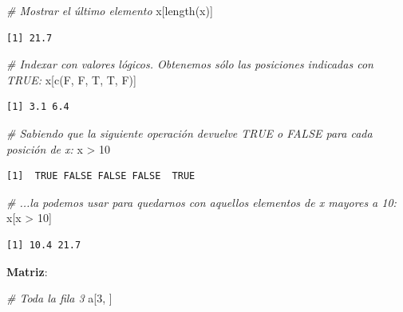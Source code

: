 \documentclass[
]{book}
\newenvironment{Shaded}{\begin{snugshade}}{\end{snugshade}}
\newcommand{\CommentTok}[1]{\textcolor[rgb]{0.56,0.35,0.01}{\textit{#1}}}
\newcommand{\DecValTok}[1]{\textcolor[rgb]{0.00,0.00,0.81}{#1}}
\newcommand{\FunctionTok}[1]{\textcolor[rgb]{0.00,0.00,0.00}{#1}}
\newcommand{\NormalTok}[1]{#1}
\newcommand{\SpecialCharTok}[1]{\textcolor[rgb]{0.00,0.00,0.00}{#1}}
\begin{document}
\begin{Shaded}
\begin{Highlighting}[]
\CommentTok{\# Mostrar el último elemento}
\NormalTok{x[}\FunctionTok{length}\NormalTok{(x)]}
\end{Highlighting}
\end{Shaded}

\begin{verbatim}
[1] 21.7
\end{verbatim}

\begin{Shaded}
\begin{Highlighting}[]
\CommentTok{\# Indexar con valores lógicos. Obtenemos sólo las posiciones indicadas con TRUE:}
\NormalTok{x[}\FunctionTok{c}\NormalTok{(F, F, T, T, F)]}
\end{Highlighting}
\end{Shaded}

\begin{verbatim}
[1] 3.1 6.4
\end{verbatim}

\begin{Shaded}
\begin{Highlighting}[]
\CommentTok{\# Sabiendo que la siguiente operación devuelve TRUE o FALSE para cada posición de x:}
\NormalTok{x }\SpecialCharTok{\textgreater{}} \DecValTok{10}
\end{Highlighting}
\end{Shaded}

\begin{verbatim}
[1]  TRUE FALSE FALSE FALSE  TRUE
\end{verbatim}

\begin{Shaded}
\begin{Highlighting}[]
\CommentTok{\# ...la podemos usar para quedarnos con aquellos elementos de x mayores a 10:}
\NormalTok{x[x }\SpecialCharTok{\textgreater{}} \DecValTok{10}\NormalTok{]}
\end{Highlighting}
\end{Shaded}

\begin{verbatim}
[1] 10.4 21.7
\end{verbatim}

\textbf{Matriz}:

\begin{Shaded}
\begin{Highlighting}[]
\CommentTok{\# Toda la fila 3}
\NormalTok{a[}\DecValTok{3}\NormalTok{, ]}
\end{Highlighting}
\end{Shaded}
\end{document}

